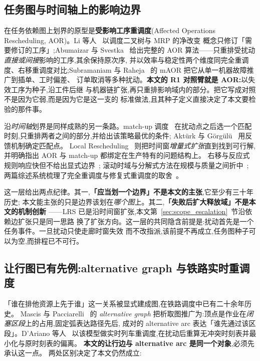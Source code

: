 \documentclass[manuscript,screen,review]{acmart}
\begin{document}
\subsection{任务图与时间轴上的影响边界}
\label{sec:rw_aor}

在任务依赖图上划界的原型是\textbf{受影响工序重调度}(Affected Operations
Rescheduling, AOR)。Li 等人~\cite{li1993heuristic} 以调度二叉树与 MRP 的净改变
概念只修订「需要修订的工序」;Abumaizar 与 Svestka~\cite{abumaizar1997rescheduling}
给出完整的 AOR 算法——只重排受扰动\emph{直接或间接}影响的工序,其余保持原次序,
并以效率与稳定性两个维度同完全重调度、右移重调度对比;Subramaniam 与
Raheja~\cite{subramaniam2003maor} 的 mAOR 把它从单一机器故障推广到插单、工时偏差、
订单取消等多种扰动。\textbf{本文的 R1 对照臂就是 AOR:}以失效工序为种子,沿工件后继
与机器链扩张,再只重排影响域内的部分。把它写成对照不是因为它弱,而是因为它是这一支的
标准做法,且其种子定义直接决定了本文要检验的那件事。

沿\emph{时间轴}划界是同样成熟的另一条路。match-up 调度~\cite{bean1991matchup}
在扰动点之后选一个匹配时刻,只重排两者之间的部分,并给出该策略最优的条件;
Aktürk 与 Görgülü~\cite{akturk1999matchup} 用反馈机制确定匹配点。
Local Rescheduling~\cite{kuster2007local} 则把时间窗\emph{增量式扩张}直到找到可行解,
并明确指出 AOR 与 match-up 都绑定在生产特有的问题结构上。
右移与反应式规则响应快但不给出显式边界~\cite{dalcastagne2020reactive};
滚动时域与分解式方法在规模与质量之间折中~\cite{zeitrag2025novel,zhao2019decomposition};
两篇综述系统梳理了完全重调度与修复式重调度的取舍~\cite{vieira2003rescheduling,ouelhadj2009survey}。

这一层给出两点纪律。其一,\textbf{「应当划一个边界」不是本文的主张},它至少有三十年历史;
本文能主张的只是边界该划在\emph{哪个图}上。其二,\textbf{「失败后扩大释放域」不是本文的机制创新}
——LRS 已是沿时间窗扩张,本文第~\ref{sec:scope_escalation}~节沿依赖边扩张只是同一思路
换了扩张方向。这一层的共同隐含前提是:扰动首先是一个任务事件。一旦扰动只使走廊时窗失效
而不改指派,该前提不再成立,任务图种子可以为空,而排程已不可行。

\subsection{让行图已有先例:alternative graph 与铁路实时重调度}
\label{sec:rw_ag}

「谁在排他资源上先于谁」这一关系被显式建成图,在铁路调度中已有二十余年历史。
Mascis 与 Pacciarelli~\cite{mascis2002alternative} 的 \emph{alternative graph}
把析取图推广为:顶点是作业在\emph{闭塞区段}上的占用,固定弧表达路径先后,
成对的 alternative arc 表达「谁先通过该区段」。D'Ariano 等人~\cite{dariano2007branch}
以该模型做实时列车重调度,在扰动后重算无冲突时刻表并最小化与原时刻表的偏离。
\textbf{本文的让行边与 alternative arc 是同一个对象},必须先承认这一点。
两处区别决定了本文仍然成立:
\end{document}
